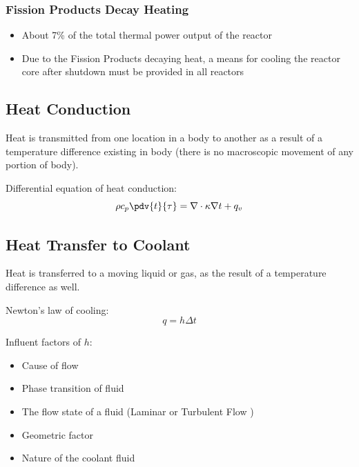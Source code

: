 \subsubsection*{Fission Products Decay Heating}

\begin{itemize}
    \item About 7\% of the total thermal power output of the reactor
    \item Due to the Fission Products decaying heat, a means for cooling the reactor core after shutdown must be provided in all reactors
\end{itemize}

\subsection{Heat Conduction}

\begin{definition}
    Heat is transmitted from one location in a body to another as a result of a temperature difference existing in body (there is no macroscopic movement of any portion of body).
\end{definition}

Differential equation of heat conduction: 
\begin{equation}
    \rho c_p \pdv{t}{\tau} = \nabla \cdot \kappa \nabla t + q_v
\end{equation}

\subsection{Heat Transfer to Coolant}

\begin{definition}
    Heat is transferred to a moving liquid or gas, as the result of a temperature difference as well.
\end{definition}

Newton's law of cooling: 
\begin{equation}
    q = h \Delta t
\end{equation}

Influent factors of $h$: 
\begin{itemize}
    \item Cause of flow
    \item Phase transition of fluid
    \item The flow state of a fluid (Laminar or Turbulent Flow )
    \item Geometric factor
    \item Nature of the coolant fluid
\end{itemize}

